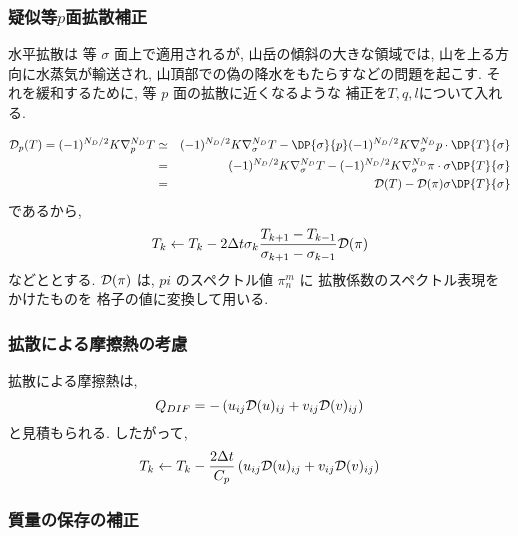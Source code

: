 \subsubsection{疑似等$p$面拡散補正}

水平拡散は 等 $\sigma$ 面上で適用されるが,
山岳の傾斜の大きな領域では, 山を上る方向に水蒸気が輸送され,
山頂部での偽の降水をもたらすなどの問題を起こす.
それを緩和するために, 等 $p$ 面の拡散に近くなるような
補正を$T,q,l$について入れる.

\begin{eqnarray}
  {\cal D}_p (T) = (-1)^{N_D/2} K \nabla^{N_D}_p T  
               & \simeq & (-1)^{N_D/2} K \nabla^{N_D}_{\sigma} T  
                      - \DP{\sigma}{p} 
                      (-1)^{N_D/2} K \nabla^{N_D}_{\sigma} p
                      \cdot \DP{T}{\sigma}                  \nonumber \\
               & =  &    (-1)^{N_D/2} K \nabla^{N_D}_{\sigma} T  
                    -  (-1)^{N_D/2} K \nabla^{N_D}_{\sigma} \pi
                          \cdot \sigma \DP{T}{\sigma} \nonumber \\
               & = &   {\cal D} (T) 
                    -  {\cal D} (\pi) 
                       \sigma \DP{T}{\sigma}
\end{eqnarray}
%
であるから,
\begin{equation}
  T_k \leftarrow  T_k 
       -  2 \Delta t
        \sigma_{k} \frac{T_{k+1}-T_{k-1}}{\sigma_{k+1} - \sigma_{k-1}}
        {\cal D}(\pi)
\end{equation}
などととする.
${\cal D}(\pi)$ は, $pi$ のスペクトル値 $\pi_n^m$ に
拡散係数のスペクトル表現をかけたものを
格子の値に変換して用いる.

\subsubsection{拡散による摩擦熱の考慮}

拡散による摩擦熱は,
\begin{equation}
  Q_{DIF} = - \left( u_{ij} {\cal D}(u)_{ij} 
                   + v_{ij} {\cal D}(v)_{ij} \right)
\end{equation}
と見積もられる.
したがって,
\begin{equation}
  T_k \leftarrow  T_k 
       -  \frac{2 \Delta t}{C_p}
           \left( u_{ij} {\cal D}(u)_{ij} 
                 + v_{ij} {\cal D}(v)_{ij} \right)
\end{equation}

\subsubsection{質量の保存の補正}


